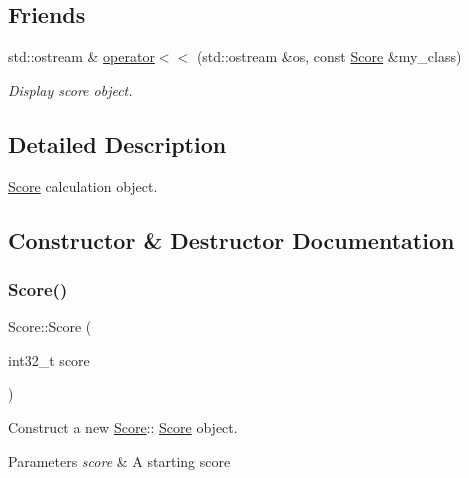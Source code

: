 \subsection*{Friends}
\begin{DoxyCompactItemize}
\item 
std\+::ostream \& \hyperlink{class_score_ab72dbd7e1916741d6f5d91b38631dcff}{operator$<$$<$} (std\+::ostream \&os, const \hyperlink{class_score}{Score} \&my\+\_\+class)
\begin{DoxyCompactList}\small\item\em Display score object. \end{DoxyCompactList}\end{DoxyCompactItemize}


\subsection{Detailed Description}
\hyperlink{class_score}{Score} calculation object. 

\subsection{Constructor \& Destructor Documentation}
\mbox{\label{class_score_a5648c0fccf943a657e712874d34fb7f5}} 
\subsubsection{\texorpdfstring{Score()}{Score()}\hspace{0.1cm}{\footnotesize\ttfamily [1/2]}}
{\footnotesize\ttfamily Score\+::\+Score (\begin{DoxyParamCaption}\item[{int32\+\_\+t}]{score }\end{DoxyParamCaption})\hspace{0.3cm}{\ttfamily [explicit]}}



Construct a new \hyperlink{class_score}{Score}\+:\+: \hyperlink{class_score}{Score} object. 


\begin{DoxyParams}{Parameters}
{\em score} & A starting score \\
\hline
\end{DoxyParams}
\mbox{\label{class_score_ae9cf3eaeba42d057bd3dea4034525164}} 
